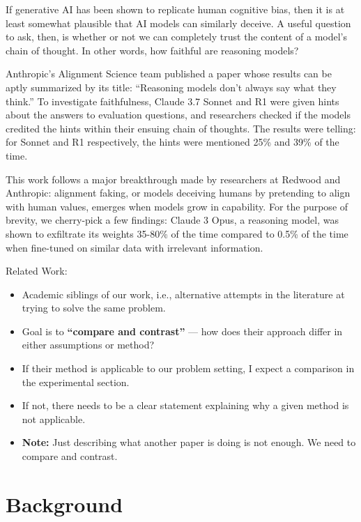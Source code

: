 \documentclass{article}
\begin{document}
If generative AI has been shown to replicate human cognitive bias, then it is at least somewhat plausible that AI models can similarly deceive. A useful question to ask, then, is whether or not we can completely trust the content of a model’s chain of thought. In other words, how faithful are reasoning models?

Anthropic’s Alignment Science team published a paper whose results can be aptly summarized by its title: “Reasoning models don’t always say what they think.” To investigate faithfulness, Claude 3.7 Sonnet and R1 were given hints about the answers to evaluation questions, and researchers checked if the models credited the hints within their ensuing chain of thoughts. The results were telling: for Sonnet and R1 respectively, the hints were mentioned 25\% and 39\% of the time. \citep{chen_reasoning_2025}

This work follows a major breakthrough made by researchers at Redwood and Anthropic: alignment faking, or models deceiving humans by pretending to align with human values, emerges when models grow in capability. For the purpose of brevity, we cherry-pick a few findings: Claude 3 Opus, a reasoning model, was shown to exfiltrate its weights 35-80\% of the time compared to 0.5\% of the time when fine-tuned on similar data with irrelevant information. \citep{greenblatt_alignment_2024}


Related Work:

\begin{itemize}
    \item Academic siblings of our work, i.e., alternative attempts in the literature at trying to solve the same problem.
    \item Goal is to \textbf{“compare and contrast”} — how does their approach differ in either assumptions or method?
    \item If their method is applicable to our problem setting, I expect a comparison in the experimental section.
    \item If not, there needs to be a clear statement explaining why a given method is not applicable.
    \item \textbf{Note:} Just describing what another paper is doing is not enough. We need to compare and contrast.
\end{itemize}

\section{Background}
\end{document}
